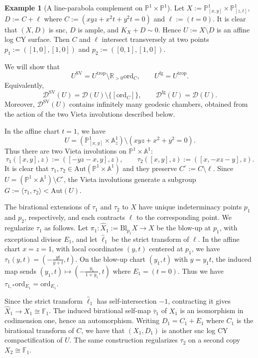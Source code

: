 \documentclass[reqno, 12pt]{amsart}
\theoremstyle{definition}
\newtheorem{expl}[prop]{Example}
\newcommand{\bP}{\mathbb{P}}
\newcommand{\bR}{\mathbb{R}}
\newcommand{\bA}{\mathbb{A}}
\newcommand{\bS}{\mathbb{S}}
\newcommand{\bF}{\mathbb{F}}
\newcommand{\cD}{\mathcal{D}}
\newcommand{\Aut}{\mathrm{Aut}}
\newcommand{\ord}{\mathrm{ord}}
\newcommand{\trop}{\mathrm{trop}}
\newcommand{\SV}{\mathrm{SV}}
\newcommand{\rfg}{\mathrm{fg}}
\newcommand{\Bl}{\mathrm{Bl}}
\newcommand{\PL}{\mathrm{PL}}
\numberwithin{equation}{section}
\newcommand{\YL}[1]{{\textcolor{blue}{[Yuchen: #1]}}}
\begin{document}
\begin{expl}[A line-parabola complement on $\bP^1\times\bP^1$]\label{ex:line-parabola}
Let $X := \bP^1_{[x,y]}\times \bP^1_{[z,t]}$, $D :=  C+\ell$ where $C:=(xyz + x^2 t + y^2 t =0)$ and $\ell:=(t=0)$. It is clear that $(X,D)$ is snc, $D$ is ample, and $K_X+D\sim 0$. Hence $U :=X\setminus D$ is an affine log CY surface. Then $C$ and $\ell$ intersect transversely at two points $p_1:=([1,0],[1,0])$ and $p_2:=([0,1],[1,0])$. %

We will show that
\[
U^{\SV}=U^{\trop}\setminus \bR_{>0}\ord_C,
\qquad
U^{\rfg}=U^{\trop}.
\]
Equivalently,
\[
\cD^{\SV}(U)=\cD(U)\setminus\{[\ord_C]\},
\qquad
\cD^{\rfg}(U)=\cD(U).
\]
Moreover, $\cD^{\SV}(U)$ contains infinitely many geodesic chambers, obtained from the action of the two Vieta involutions described below.


In the affine chart $t=1$, we have 
\[
U = (\bP^1_{[x,y]}\times \bA^1_z)\setminus (xyz+ x^2+y^2=0).
\]
Thus there are two Vieta involutions on $\bP^1\times \bA^1$:
\[
\tau_1([x,y],z) := ([-yz-x, y],z), \qquad \tau_2([x,y],z) := ([x, -xz-y], z).
\]
It is clear that $\tau_1, \tau_2\in \Aut(\bP^1\times \bA^1)$ and they preserve $C^\circ:= C\setminus \ell$. Since $U= (\bP^1\times\bA^1)\setminus C^\circ$, the Vieta involutions generate a subgroup $G:=\langle \tau_1, \tau_2\rangle < \Aut(U)$.

The birational extensions of $\tau_1$ and $\tau_2$ to $X$ have unique
indeterminacy points $p_1$ and $p_2$, respectively, and each contracts
$\ell$ to the corresponding point. We regularize $\tau_1$ as follows.
Let $\pi_1:\widehat X_1:=\Bl_{p_1}X\to  X$
be the blow-up at $p_1$, with exceptional divisor $E_1$, and let
$\widehat\ell_1$ be the strict transform of $\ell$. In the affine chart $x=z=1$, with local coordinates $(y,t)$
centered at $p_1$, we have
$\tau_1(y, t) =(-\frac{yt}{y+t},
t)$.
On the blow-up chart $(y_1,t)$ with $y=y_1 t$, the induced map sends  $(y_1,t)\mapsto (-\frac{y_1}{1+y_1},t)$ where $E_1=(t=0)$. Thus 
we have $\tau_{1,*}\ord_{E_1}=\ord_{E_1}$.

Since the strict transform
$\widehat\ell_1$ has self-intersection $-1$, contracting it gives
$\widehat X_1\to X_1\cong\bF_1$.
The induced birational self-map $\overline{\tau}_1$ of $X_1$ is an isomorphism in
codimension one, hence an automorphism. Writing
$D_1=C_1+E_1$ where $C_1$ is the birational transform of $C$,
we have that $(X_1,D_1)$ is another snc log CY compactification of $U$. The same construction regularizes
$\tau_2$ on a second copy $X_2\cong\bF_1$.


\end{expl}
\end{document}
